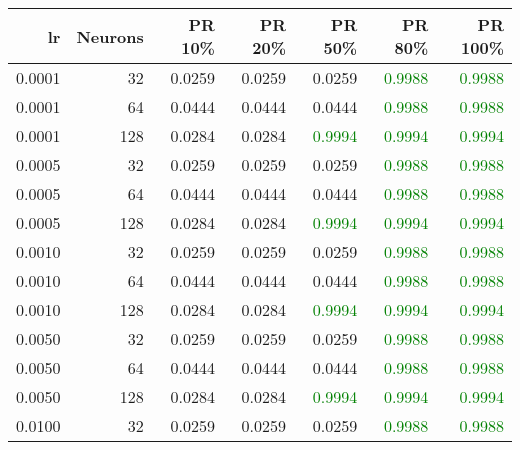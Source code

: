 \begin{tabular}{rrrrrrr}
\toprule
lr & Neurons & PR 10\% & PR 20\% & PR 50\% & PR 80\% & PR 100\% \\
\midrule
0.0001 & 32 & \textcolor{blu} {0.0259} & \textcolor{blu} {0.0259} & \textcolor{blu} {0.0259} & \textcolor{green} {0.9988} & \textcolor{green} {0.9988} \\
0.0001 & 64 & \textcolor{blu} {0.0444} & \textcolor{blu} {0.0444} & \textcolor{blu} {0.0444} & \textcolor{green} {0.9988} & \textcolor{green} {0.9988} \\
0.0001 & 128 & \textcolor{blu} {0.0284} & \textcolor{blu} {0.0284} & \textcolor{green} {0.9994} & \textcolor{green} {0.9994} & \textcolor{green} {0.9994} \\
0.0005 & 32 & \textcolor{blu} {0.0259} & \textcolor{blu} {0.0259} & \textcolor{blu} {0.0259} & \textcolor{green} {0.9988} & \textcolor{green} {0.9988} \\
0.0005 & 64 & \textcolor{blu} {0.0444} & \textcolor{blu} {0.0444} & \textcolor{blu} {0.0444} & \textcolor{green} {0.9988} & \textcolor{green} {0.9988} \\
0.0005 & 128 & \textcolor{blu} {0.0284} & \textcolor{blu} {0.0284} & \textcolor{green} {0.9994} & \textcolor{green} {0.9994} & \textcolor{green} {0.9994} \\
0.0010 & 32 & \textcolor{blu} {0.0259} & \textcolor{blu} {0.0259} & \textcolor{blu} {0.0259} & \textcolor{green} {0.9988} & \textcolor{green} {0.9988} \\
0.0010 & 64 & \textcolor{blu} {0.0444} & \textcolor{blu} {0.0444} & \textcolor{blu} {0.0444} & \textcolor{green} {0.9988} & \textcolor{green} {0.9988} \\
0.0010 & 128 & \textcolor{blu} {0.0284} & \textcolor{blu} {0.0284} & \textcolor{green} {0.9994} & \textcolor{green} {0.9994} & \textcolor{green} {0.9994} \\
0.0050 & 32 & \textcolor{blu} {0.0259} & \textcolor{blu} {0.0259} & \textcolor{blu} {0.0259} & \textcolor{green} {0.9988} & \textcolor{green} {0.9988} \\
0.0050 & 64 & \textcolor{blu} {0.0444} & \textcolor{blu} {0.0444} & \textcolor{blu} {0.0444} & \textcolor{green} {0.9988} & \textcolor{green} {0.9988} \\
0.0050 & 128 & \textcolor{blu} {0.0284} & \textcolor{blu} {0.0284} & \textcolor{green} {0.9994} & \textcolor{green} {0.9994} & \textcolor{green} {0.9994} \\
0.0100 & 32 & \textcolor{blu} {0.0259} & \textcolor{blu} {0.0259} & \textcolor{blu} {0.0259} & \textcolor{green} {0.9988} & \textcolor{green} {0.9988} \\

\end{tabular}
